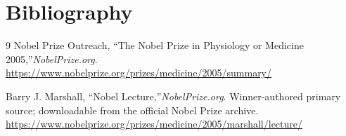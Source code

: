 \section{Bibliography}

\begin{thebibliography}{9}
Nobel Prize Outreach, ``The Nobel Prize in Physiology or Medicine 2005,''\emph{NobelPrize.org}.\\
\url{https://www.nobelprize.org/prizes/medicine/2005/summary/}

Barry J. Marshall, ``Nobel Lecture,''\emph{NobelPrize.org}. Winner-authored primary source; downloadable from the official Nobel Prize archive.\\
\url{https://www.nobelprize.org/prizes/medicine/2005/marshall/lecture/}
\end{thebibliography}
